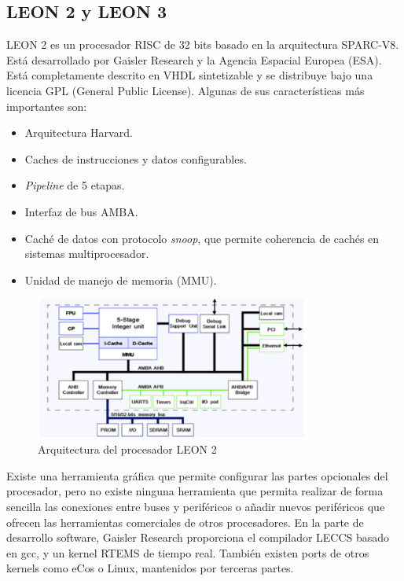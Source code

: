    	\subsection{LEON 2 y LEON 3}

LEON 2 es un procesador RISC de 32 bits basado en la arquitectura SPARC-V8\cite{Etiqueta33}. Está desarrollado por Gaisler Research y la Agencia Espacial Europea (ESA). Está completamente descrito en VHDL sintetizable y se distribuye bajo una licencia GPL (General Public License). Algunas de sus características más importantes son:

\begin{itemize}
		 \item  Arquitectura Harvard.
		 \item  Caches de instrucciones y datos configurables.
	       \item \textit{Pipeline} de 5 etapas.
		 \item  Interfaz de bus AMBA.
 		\item  Caché de datos con protocolo \textit{snoop}, que permite coherencia de cachés en sistemas multiprocesador.
		\item Unidad de manejo de memoria (MMU).
		\end{itemize}
	
\begin{figure}[h!]
 	\begin{center}
  	\includegraphics[width=0.8\textwidth,keepaspectratio=true]{./images/leon}
  	\caption{Arquitectura del procesador LEON 2}
 	\end{center}
	\end{figure}

Existe una herramienta gráfica que permite configurar las partes opcionales del procesador, pero no existe ninguna herramienta que permita realizar de forma sencilla las conexiones entre buses y periféricos o añadir nuevos periféricos que ofrecen las herramientas comerciales de otros procesadores. En la parte de desarrollo software, Gaisler Research proporciona el compilador LECCS basado en gcc, y un kernel RTEMS de tiempo real. También existen ports de otros kernels como eCos o Linux, mantenidos por terceras partes.

